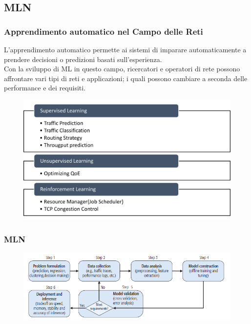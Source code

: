 \documentclass[xcolor=dvipsnames]{beamer}
\begin{document}
    \subsection{MLN}
    \begin{frame}
    \frametitle{Apprendimento automatico nel Campo delle Reti}
    L'\alert{apprendimento automatico} permette ai sistemi di imparare automaticamente a prendere decisioni o predizioni basati sull'esperienza.\\
    Con la sviluppo di ML in questo campo, ricercatori e operatori di rete possono affrontare vari tipi di reti e applicazioni; i quali possono cambiare a seconda delle performance e dei requisiti.
    \begin{figure}[htbp]
        \includegraphics[width=.75\textwidth,height=.62\textheight]{RicercaMLNetworking.png}
    \end{figure}
\end{frame}

\begin{frame}
    \frametitle{MLN}
    \begin{figure}
        \includegraphics[width=.95\textwidth,height=.42\textheight]{WorkFlowNetworking.png}
    \end{figure}
    

\end{frame}
\end{document}
